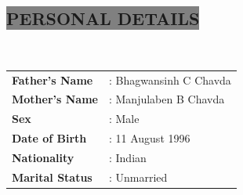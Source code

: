 \documentclass{res} %
\begin{document}
\begin{resume}
\section{
\colorbox{grey}{PERSONAL DETAILS} 
}
\ \\ [0.5ex]
\begin{tabular}{p{4cm}l}
\textbf{Father's Name} &  {:} Bhagwansinh C Chavda\\ [0.5ex]
\textbf{Mother's Name} & {:}  Manjulaben B Chavda \\ [0.5ex]
\textbf{Sex} &  {:} Male\\ [0.5ex]
\textbf{Date of Birth} & {:} 11 August 1996\\ [0.5ex]
\textbf{Nationality} &  {:} Indian\\ [0.5ex]
\textbf{Marital Status} & {:}  Unmarried\\ [0.5ex]
\end{tabular}







\end{resume}
\end{document}
